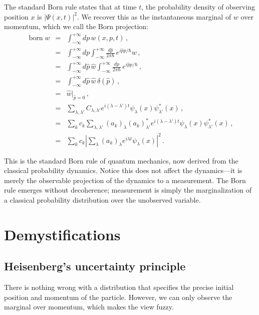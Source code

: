 \documentclass[prb,preprint]{revtex4-1}
\DeclareMathOperator\born{born}
\begin{document}
The standard Born rule states that at time $t$, the probability density of observing position $x$ is $|\Psi(x,t)|^2$.  We recover this as the instantaneous marginal of $w$ over momentum, which we call the Born projection:
\begin{eqnarray}
\born w &=& \int_{-\infty}^{+\infty} dp \, w(x,p,t) \,, \label{eq:born-1}\\
&=& \int_{-\infty}^{+\infty} dp \int_{-\infty}^{+\infty} \frac{d\hat{p}}{2\pi \hbar} \, e^{i\hat{p}p/\hbar} \hat{w} \,, \label{eq:born-2}\\
&=& \int_{-\infty}^{+\infty} d\hat{p} \, \hat{w} \int_{-\infty}^{+\infty} \frac{dp}{2\pi \hbar} \, e^{i\hat{p}p/\hbar} \,, \label{eq:born-3}\\
&=& \int_{-\infty}^{+\infty} d\hat{p} \, \hat{w}\,\delta(\hat{p}) \,, \label{eq:born-4}\\
&=& \hat{w}|_{\hat{p}=0} \,, \label{eq:born-5}\\
&=& \sum_{\lambda,\lambda'} C_{\lambda,\lambda'} e^{i(\lambda-\lambda')t} \psi_\lambda(x)\psi^*_{\lambda'}(x) \,, \label{eq:born-6}\\
&=& \sum_k c_k \sum_{\lambda,\lambda'} (a_k)_{\lambda} (a_k)_{\lambda'}^* e^{i(\lambda-\lambda')t} \psi_\lambda(x)\psi^*_{\lambda'}(x) \,, \label{eq:born-7}\\
&=& \sum_k c_k \left| \sum_{\lambda} (a_k)_{\lambda} e^{i\lambda t} \psi_\lambda(x) \right|^2 \,. \label{eq:born-rule}
\end{eqnarray}

This is the standard Born rule of quantum mechanics, now derived from the classical probability dynamics.  Notice this does not affect the dynamics---it is merely the observable projection of the dynamics to a measurement.  The Born rule emerges without decoherence;\cite{zurek2003} measurement is simply the marginalization of a classical probability distribution over the unobserved variable.


\section{Demystifications}

\subsection{Heisenberg's uncertainty principle}

There is nothing wrong with a distribution that specifies the precise initial position and
momentum of the particle.  However, we can only observe the marginal over momentum, which makes
the view fuzzy.
\end{document}
